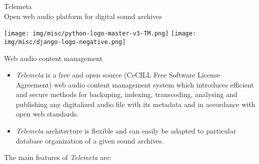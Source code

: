 \documentclass[final, hyperref, table]{beamer}
\begin{document}
\begin{frame}[containsverbatim]{}
\begin{columns}[T]
\begin{column}[T]{.5\linewidth}
      \begin{block}{{\Large Telemeta}\\Open web audio platform for
          digital sound archives}
        \begin{center}
          \begin{center}
            \texttt{[image: img/misc/python-logo-master-v3-TM.png]}\hspace{3cm}
            \texttt{[image: img/misc/django-logo-negative.png]}
          \end{center}

        \begin{minipage}[h]{0.97\linewidth}
          \begin{block}{Web audio content management}
            \begin{itemize}
            \item \emph{Telemeta} is a free and open source
              ({\scriptsize CeCILL Free Software License Agreement})
              web audio content management system which introduces
              efficient and secure methods for \alert{backuping},
              \alert{indexing}, \alert{transcoding}, \alert{analysing}
              and \alert{publishing} any digitalized audio file with
              its metadata and in accordance with \alert{open
                web standards}.
            \item \emph{Telemeta} architecture is \alert{flexible} and
              can easily be adapted to particular database
              organization of a given sound archives.
            \end{itemize}

            The main features of \emph{Telemeta} are: \vspace{-0.5cm}
            \begin{multicols}{2}[]
        

\end{multicols}
\end{block}
\end{minipage}
\end{center}
\end{block}
\end{column}
\end{columns}
\end{frame}
\end{document}

